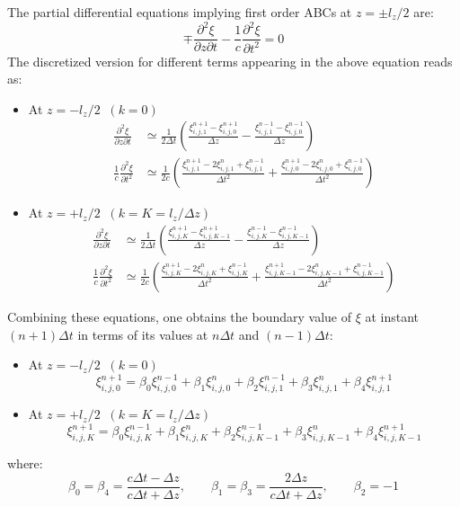 The partial differential equations implying first order ABCs at $ z=\pm l_{z}/2 $ are:
%
\begin{equation}
\mp \frac{\partial^2 \xi}{\partial z \partial t} - \frac{1}{c}\frac{\partial^2 \xi}{\partial t^2}=0
\end{equation}
%
The discretized version for different terms appearing in the above equation reads as:
%
\begin{itemize}
\item At $z=-l_{z}/2 \; \; (k=0)$
\begin{align}
\frac{\partial^2 \xi}{\partial z \partial t} & \simeq \frac{1}{2 \Delta t } \left( \frac{\xi_{i,j,1}^{n+1}-\xi_{i,j,0}^{n+1}}{\Delta z}-\frac{\xi_{i,j,1}^{n-1}-\xi_{i,j,0}^{n-1}}{\Delta z} \right) \\
\frac{1}{c}\frac{\partial^2 \xi}{\partial t^2} & \simeq \frac{1}{2c} \left( \frac{\xi_{i,j,1}^{n+1}-2\xi_{i,j,1}^n+\xi_{i,j,1}^{n-1}}{\Delta t^2}+\frac{\xi_{i,j,0}^{n+1}-2\xi_{i,j,0}^n+\xi_{i,j,0}^{n-1}}{\Delta t^2} \right)
\end{align}
\item At $z=+l_{z}/2 \; \; (k=K=l_{z}/\Delta z)$
\begin{align}
\frac{\partial^2 \xi}{\partial z \partial t} & \simeq \frac{1}{2 \Delta t } \left( \frac{\xi_{i,j,K}^{n+1}-\xi_{i,j,K-1}^{n+1}}{\Delta z}-\frac{\xi_{i,j,K}^{n-1}-\xi_{i,j,K-1}^{n-1}}{\Delta z} \right) \\
\frac{1}{c} \frac{\partial^2 \xi}{\partial t^2} & \simeq \frac{1}{2c} \left( \frac{\xi_{i,j,K}^{n+1}-2\xi_{i,j,K}^n+\xi_{i,j,K}^{n-1}}{\Delta t^2} + \frac{\xi_{i,j,K-1}^{n+1}-2\xi_{i,j,K-1}^n+\xi_{i,j,K-1}^{n-1}}{\Delta t^2} \right)
\end{align}
\end{itemize}
%
Combining these equations, one obtains the boundary value of $\xi$ at instant $(n+1)\Delta t$ in terms of its values at $n\Delta t$ and $(n-1)\Delta t$: \\
%
\begin{itemize}
\item At $z=-l_{z}/2 \; \; (k=0)$
\begin{equation}
\xi_{i,j,0}^{n+1} = \beta_0 \xi_{i,j,0}^{n-1} + \beta_1 \xi_{i,j,0}^n+ \beta_2 \xi_{i,j,1}^{n-1} + \beta_3 \xi_{i,j,1}^n + \beta_4 \xi_{i,j,1}^{n+1}
\end{equation}
\item At $z=+l_{z}/2 \; \; (k=K=l_{z}/\Delta z)$
\begin{equation}
\xi_{i,j,K}^{n+1} = \beta_0 \xi_{i,j,K}^{n-1} + \beta_1 \xi_{i,j,K}^n+ \beta_2 \xi_{i,j,K-1}^{n-1} + \beta_3 \xi_{i,j,K-1}^n + \beta_4 \xi_{i,j,K-1}^{n+1}
\end{equation}
\end{itemize}
%
where:
%
\begin{equation}
\beta_0 = \beta_4 = \frac{c \Delta t - \Delta z}{c \Delta t + \Delta z},
\qquad
\beta_1 = \beta_3 = \frac{2 \Delta z}{c \Delta t + \Delta z},
\qquad
\beta_2 = -1
\end{equation}

